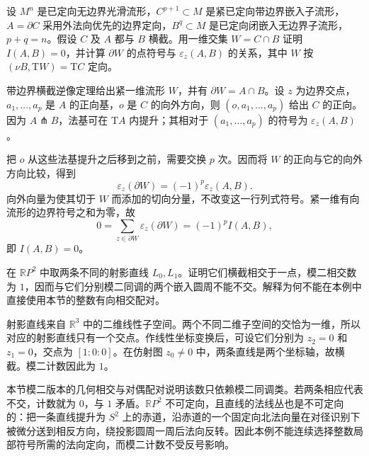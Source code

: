 \begin{exercise}\label{g2:ex:intersection-boundary-sign}
	设 \(M^n\) 是已定向无边界光滑流形，\(C^{p+1}\subset M\) 是紧已定向带边界嵌入子流形，\(A=\partial C\) 采用外法向优先的边界定向，\(B^q\subset M\) 是已定向闭嵌入无边界子流形，\(p+q=n\)。假设 \(C\) 及 \(A\) 都与 \(B\) 横截。用一维交集 \(W=C\cap B\) 证明 \(I(A,B)=0\)，并计算 \(\partial W\) 的点符号与 \(\varepsilon_z(A,B)\) 的关系，其中 \(W\) 按 \((\nu B,\mathrm{T}W)=\mathrm{T}C\) 定向。
\end{exercise}
\begin{solution}
	带边界横截逆像定理给出紧一维流形 \(W\)，并有 \(\partial W=A\cap B\)。设 \(z\) 为边界交点，\(a_1,\ldots,a_p\) 是 \(A\) 的正向基，\(o\) 是 \(C\) 的向外方向，则 \((o,a_1,\ldots,a_p)\) 给出 \(C\) 的正向。因为 \(A\pitchfork B\)，法基可在 \(\mathrm{T}A\) 内提升；其相对于 \((a_1,\ldots,a_p)\) 的符号为 \(\varepsilon_z(A,B)\)。

	把 \(o\) 从这些法基提升之后移到之前，需要交换 \(p\) 次。因而将 \(W\) 的正向与它的向外方向比较，得到
	\[
		\varepsilon_z(\partial W)=(-1)^p\varepsilon_z(A,B).
	\]
	向外向量为使其切于 \(W\) 而添加的切向分量，不改变这一行列式符号。紧一维有向流形的边界符号之和为零，故
	\[
		0=\sum_{z\in\partial W}\varepsilon_z(\partial W)=(-1)^pI(A,B),
	\]
	即 \(I(A,B)=0\)。
\end{solution}

\begin{exercise}\label{g2:ex:projective-lines-mod-two-intersection}
	在 \(\mathbb RP^2\) 中取两条不同的射影直线 \(L_0,L_1\)。证明它们横截相交于一点，模二相交数为 \(1\)，因而与它们分别模二同调的两个嵌入圆周不能不交。解释为何不能在本例中直接使用本节的整数有向相交配对。
\end{exercise}
\begin{solution}
	射影直线来自 \(\mathbb R^3\) 中的二维线性子空间。两个不同二维子空间的交恰为一维，所以对应的射影直线只有一个交点。作线性坐标变换后，可设它们分别为 \(z_2=0\) 和 \(z_1=0\)，交点为 \([1:0:0]\)。在仿射图 \(z_0\ne0\) 中，两条直线是两个坐标轴，故横截。模二计数因此为 \(1\)。

	本节模二版本的几何相交与对偶配对说明该数只依赖模二同调类。若两条相应代表不交，计数就为 \(0\)，与 \(1\) 矛盾。\(\mathbb RP^2\) 不可定向，且直线的法线丛也是不可定向的：把一条直线提升为 \(S^2\) 上的赤道，沿赤道的一个固定向北法向量在对径识别下被微分送到相反方向，绕投影圆周一周后法向反转。因此本例不能连续选择整数局部符号所需的法向定向，而模二计数不受反号影响。
\end{solution}


